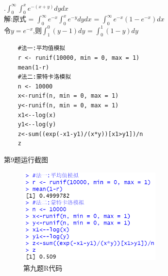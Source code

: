 \documentclass{book}
\begin{document}
\hspace*{\fill} \\

.$\int_{0}^{\infty}\int_{0}^{x}e^{-(x+y)}dydx$   \\
解:原式 = $\int_{0}^{\infty}e^{-x}\int_{0}^{x}e^{-y}dydx$ = $\int_{0}^{\infty}e^{-x}(1-e^{-x})dx$  \\
\indent
令$y = e^{-x}$,则$\int_{1}^{0}(y-1)dy$ = $\int_{0}^{1}(1-y)dy$
\lstset{language = R}
\begin{lstlisting}
    #法一:平均值模拟
    r <- runif(10000, min = 0, max = 1)
    mean(1-r)
    #法二:蒙特卡洛模拟
    n <- 10000
    x<-runif(n, min = 0, max = 1)
    y<-runif(n, min = 0, max = 1)
    x1<--log(x)
    y1<--log(y)
    z<-sum((exp(-x1-y1)/(x*y))[x1>y1])/n
    z
\end{lstlisting}
第9题运行截图
\begin{figure}[H]
    \centering
    \includegraphics*[height = 4.9cm, width = 7.2cm]{gramFile/第九题运行截图.PNG}
    \caption{第九题R代码}
\end{figure}

\hspace*{\fill} \\
\end{document}

